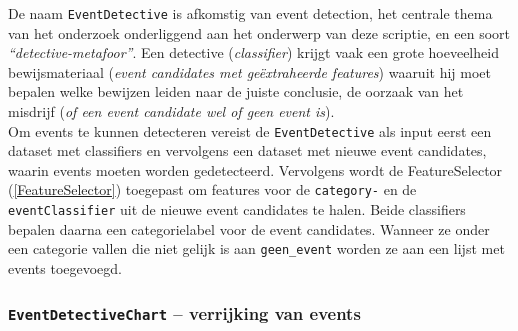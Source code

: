 \documentclass[a4paper,10pt,titlepage]{article}
\def\vl{\\[9pt]}                              %
\def\sss{\subsubsection}                      %
\def\ttt{\texttt}                             %
\def\it{\textit}                              %
\begin{document}
{{De naam \ttt{EventDetective} is afkomstig van event detection, het centrale thema van 
het onderzoek onderliggend aan het onderwerp van deze scriptie, en een soort 
\it{``detective-metafoor''}. Een detective (\it{classifier}) krijgt vaak een grote 
hoeveelheid bewijsmateriaal (\it{event candidates met geëxtraheerde features}) waaruit 
hij moet bepalen welke bewijzen leiden naar de juiste conclusie, de oorzaak van 
het misdrijf (\it{of een event candidate wel of geen event is}).
\vl
Om events te kunnen detecteren vereist de \ttt{EventDetective} als input eerst een 
dataset met classifiers en vervolgens een dataset met nieuwe event candidates, 
waarin events moeten worden gedetecteerd.  
Vervolgens wordt de FeatureSelector (\ref{FeatureSelector}) toegepast om features voor de \ttt{category-} 
en de \ttt{eventClassifier} uit de nieuwe event candidates te halen. Beide 
classifiers bepalen daarna een categorielabel voor de event candidates. Wanneer 
ze onder een categorie vallen die niet gelijk is aan \ttt{geen\_event} worden ze aan 
een lijst met events toegevoegd.

\sss{\ttt{EventDetectiveChart} – verrijking van events}\label{EventDetectiveChart}

}}
\end{document}
